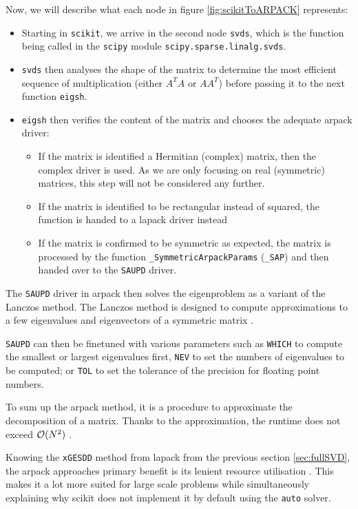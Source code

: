 Now, we will describe what each node in figure \ref{fig:scikitToARPACK} represents:
\begin{itemize}
	\item Starting in \texttt{scikit}, we arrive in the second node \texttt{svds}, which is the function being called in the \texttt{scipy} module \texttt{scipy.sparse.linalg.svds}.
	\item \texttt{svds} then analyses the shape of the matrix to determine the most efficient sequence of multiplication (either $A^TA$ or $AA^T$) before passing it to the next function \texttt{eigsh}.
	\item \texttt{eigsh} then verifies the content of the matrix and chooses the adequate \acrshort{arpack} driver:
	\begin{itemize}
		\item If the matrix is identified a Hermitian (complex) matrix, then the complex driver is used. As we are only focusing on real (symmetric) matrices, this step will not be considered any further.
		\item If the matrix is identified to be rectangular instead of squared, the function is handed to a \acrshort{lapack} driver instead
		\item If the matrix is confirmed to be symmetric as expected, the matrix is processed by the function \texttt{\_SymmetricArpackParams} (\texttt{\_SAP}) and then handed over to the \texttt{SAUPD} driver.
	\end{itemize}
\end{itemize}

The \texttt{SAUPD} driver in \acrshort{arpack} then solves the eigenproblem as a variant of the Lanczos method.
The Lanczos method is designed to compute approximations to a few eigenvalues and eigenvectors of a symmetric matrix \cite{lehoucq1998arpack}.

\texttt{SAUPD} can then be finetuned with various parameters such as \texttt{WHICH} to compute the smallest or largest eigenvalues first, \texttt{NEV} to set the numbers of eigenvalues to be computed; or \texttt{TOL} to set the tolerance of the precision for floating point numbers.
\bigskip

To sum up the \acrshort{arpack} method, it is a procedure to approximate the decomposition of a matrix.
Thanks to the approximation, the runtime does not exceed $\mathcal{O}(N^2)$ \cite{brunton2019data, wright2001large}.

Knowing the \texttt{xGESDD} method from \acrshort{lapack} from the previous section \ref{sec:fullSVD}, the \acrshort{arpack} approaches primary benefit is its lenient resource utilisation \cite{anderson1999lapack}.
This makes it a lot more suited for large scale problems while simultaneously explaining why \gls{scikit} does not implement it by default using the \texttt{auto} solver.


